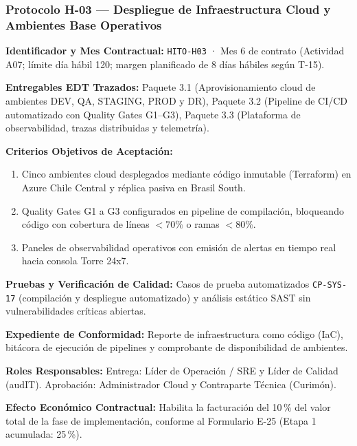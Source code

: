 \subsubsection*{Protocolo H-03 — Despliegue de Infraestructura Cloud y Ambientes Base Operativos}\label{sec:9-proto-h3}
\par\noindent\textbf{Identificador y Mes Contractual:} \texttt{HITO-H03} · Mes 6 de contrato (Actividad A07; límite día hábil 120; margen planificado de 8 días hábiles según T-15).\par
\par\noindent\textbf{Entregables EDT Trazados:} Paquete 3.1 (Aprovisionamiento cloud de ambientes DEV, QA, STAGING, PROD y DR), Paquete 3.2 (Pipeline de CI/CD automatizado con Quality Gates G1--G3), Paquete 3.3 (Plataforma de observabilidad, trazas distribuidas y telemetría).\par
\par\noindent\textbf{Criterios Objetivos de Aceptación:}
\begin{enumerate}
  \item Cinco ambientes cloud desplegados mediante código inmutable (Terraform) en Azure Chile Central y réplica pasiva en Brasil South.
  \item Quality Gates G1 a G3 configurados en pipeline de compilación, bloqueando código con cobertura de líneas $< 70\%$ o ramas $< 80\%$.
  \item Paneles de observabilidad operativos con emisión de alertas en tiempo real hacia consola Torre 24x7.
\end{enumerate}
\par\noindent\textbf{Pruebas y Verificación de Calidad:} Casos de prueba automatizados \texttt{CP-SYS-17} (compilación y despliegue automatizado) y análisis estático SAST sin vulnerabilidades críticas abiertas.\par
\par\noindent\textbf{Expediente de Conformidad:} Reporte de infraestructura como código (IaC), bitácora de ejecución de pipelines y comprobante de disponibilidad de ambientes.\par
\par\noindent\textbf{Roles Responsables:} Entrega: Líder de Operación / SRE y Líder de Calidad (audIT). Aprobación: Administrador Cloud y Contraparte Técnica (Curimón).\par
\par\noindent\textbf{Efecto Económico Contractual:} Habilita la facturación del 10\,\% del valor total de la fase de implementación, conforme al Formulario E-25 (Etapa 1 acumulada: 25\,\%).\par

